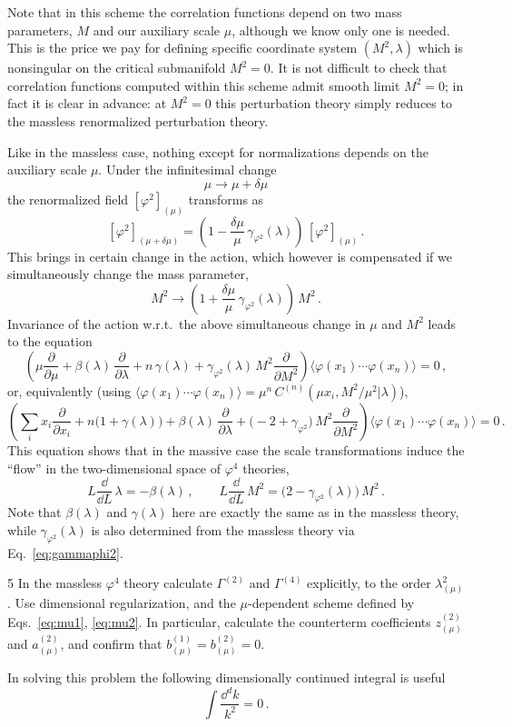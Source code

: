 Note that in this scheme the correlation functions depend on two mass
parameters, $M$ and our auxiliary scale $\mu$, although we know only one is
needed. This is the price we pay for defining specific coordinate system
$(M^2,\lambda)$ which is nonsingular on the critical submanifold $M^2=0$. It is
not difficult to check that correlation functions computed within this scheme
admit smooth limit $M^2=0$; in fact it is clear in advance: at $M^2=0$ this
perturbation theory simply reduces to the massless renormalized perturbation
theory.

Like in the massless case, nothing except for normalizations depends on the
auxiliary scale $\mu$. Under the infinitesimal change
\[
\mu\to\mu+\delta\mu
\]
the renormalized field $[\varphi^2]_{(\mu)}$ transforms as
\[
[\varphi^2]_{(\mu+\delta\mu)}=\left(1-\frac{\delta\mu}\mu\,\gamma_{\varphi^2}(\lambda)\right)\,[\varphi^2]_{(\mu)}\,.
\]
This brings in certain change in the action, which however is compensated if we
simultaneously change the mass parameter,
\[
M^2\to\left(1+\frac{\delta\mu}\mu\,\gamma_{\varphi^2}(\lambda)\right)\,M^2\,.
\]
Invariance of the action w.r.t.\ the above simultaneous change in $\mu$ and $M^2$
leads to the equation
\[
\left(\mu\frac\partial{\partial\mu}+\beta(\lambda)\,\frac\partial{\partial\lambda}+n\,\gamma(\lambda)+\gamma_{\varphi^2}(\lambda)\,M^2\frac\partial{\partial M^2}\right)\bigl\langle\varphi(x_1)\cdots\varphi(x_n)\bigr\rangle=0\,,
\]
or, equivalently (using $\langle\varphi(x_1)\cdots\varphi(x_n)\rangle=\mu^n\,C^{(n)}(\mu x_i,M^2/\mu^2|\lambda)$),
\[
\left(\sum_ix_i\frac\partial{\partial x_i}+n\bigl(1+\gamma(\lambda)\bigr)+\beta(\lambda)\,\frac\partial{\partial\lambda}+\bigl(-2+\gamma_{\varphi^2}\bigr)\,M^2\frac\partial{\partial M^2}\right)\bigl\langle\varphi(x_1)\cdots\varphi(x_n)\bigr\rangle=0\,.
\]
This equation shows that in the massive case the scale transformations induce the
``flow'' in the two-dimensional space of $\varphi^4$ theories,
\begin{equation}\label{eq:massflow}
L\frac{\dd}{\dd L}\,\lambda=-\beta(\lambda)\,,\qquad L\frac{\dd}{\dd L}\,M^2=\bigl(2-\gamma_{\varphi^2}(\lambda)\bigr)\,M^2\,.
\end{equation}
Note that $\beta(\lambda)$ and $\gamma(\lambda)$ here are exactly the same as in the
massless theory, while $\gamma_{\varphi^2}(\lambda)$ is also determined from the
massless theory via Eq.~\eqref{eq:gammaphi2}.

\begin{hwproblem}{5}\label{hw:5}
In the massless $\varphi^4$ theory calculate $\Gamma^{(2)}$ and $\Gamma^{(4)}$
explicitly, to the order $\lambda_{(\mu)}^2$. Use dimensional regularization, and
the $\mu$-dependent scheme defined by Eqs.~\eqref{eq:mu1}, \eqref{eq:mu2}. In
particular, calculate the counterterm coefficients $z^{(2)}_{(\mu)}$ and
$a^{(2)}_{(\mu)}$, and confirm that $b^{(1)}_{(\mu)}=b^{(2)}_{(\mu)}=0$.

In solving this problem the following dimensionally continued integral is useful
\[
\int\frac{\dd^dk}{k^2}=0\,.
\]
\end{hwproblem}

